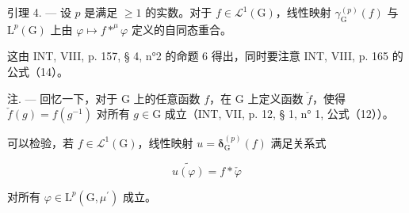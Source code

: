 引理 4. --- 设 \(p\) 是满足 \(\geqslant 1\) 的实数。对于 \(f \in \mathcal{L}^1(\mathrm{G})\)，线性映射 \(\gamma_{\mathrm{G}}^{(p)}(f)\) 与 \(\mathrm{L}^p(\mathrm{G})\) 上由 \(\varphi \mapsto f *^\mu \varphi\) 定义的自同态重合。

这由 INT, VIII, p. 157, § 4, n°2 的命题 6 得出，同时要注意 INT, VIII, p. 165 的公式（14）。

注. --- 回忆一下，对于 G 上的任意函数 \(f\)，在 G 上定义函数 \(\check{f}\)，使得 \(\check{f}(g) = f(g^{-1})\) 对所有 \(g \in \mathrm{G}\) 成立（INT, VII, p. 12, § 1, n° 1, 公式（12））。

可以检验，若 \(f \in \mathcal{L}^{1}(\mathrm{G})\)，线性映射 \(u = \boldsymbol{\delta}_{\mathrm{G}}^{(p)}(f)\) 满足关系式

\[
\widetilde {u (\varphi)} = f * \check {\varphi}
\]

对所有 \(\varphi\in\mathrm{L}^{p}(\mathrm{G},\mu^{\prime})\) 成立。